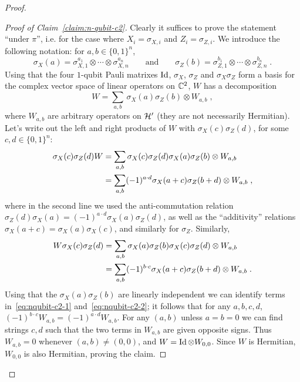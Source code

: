 \begin{proof}
\begin{proof}[Proof of Claim~\ref{claim:n-qubit-c2}]
Clearly it suffices to prove the statement ``under $\pi$'', i.e. for the case where $X_i = \sigma_{X,i}$ and $Z_i = \sigma_{Z,i}$. We introduce the following notation: for $a,b\in\{0,1\}^n$, 
\[\sigma_X(a) = \sigma_{X,1}^{a_1} \otimes \cdots \otimes \sigma_{X,n}^{a_n}\qquad\text{and}\qquad\sigma_Z(b) = \sigma_{Z,1}^{b_1} \otimes \cdots \otimes \sigma_{Z,n}^{b_n}\;.\]
Using that the four $1$-qubit Pauli matrixes $\mathop{\rm Id}\nolimits$, $\sigma_X$, $\sigma_Z$ and $\sigma_X\sigma_Z$ form a basis for the complex vector space of linear operators on $\mathbb{C}^2$, $W$ has a decomposition 
\[ W = \sum_{a,b}\, \sigma_X(a) \sigma_Z(b) \otimes W_{a,b}\;,\]
where $W_{a,b}$ are arbitrary operators on $\mathcal{H}'$ (they are not necessarily Hermitian).
Let's write out the left and right products of $W$ with $\sigma_X(c)\sigma_Z(d)$, for some $c,d\in\{0,1\}^n$:
\begin{align}
 \sigma_X(c)\sigma_Z(d) W &= \sum_{a,b} \sigma_X(c)\sigma_Z(d) \sigma_X(a) \sigma_Z(b) \otimes W_{a,b}\notag\\
&= \sum_{a,b} (-1)^{a\cdot d} \sigma_X(a+c) \sigma_Z(b+d) \otimes W_{a,b}\;,\label{eq:nqubit-c2-1}
\end{align}
where in the second line we used the anti-commutation relation $\sigma_Z(d) \sigma_X(a) =(-1)^{a\cdot d} \sigma_X(a) \sigma_Z(d)$, as well as the ``additivity'' relations $\sigma_X(a+c)=\sigma_X(a)\sigma_X(c)$, and similarly for $\sigma_Z$. Similarly, 
\begin{align}
 W  \sigma_X(c)\sigma_Z(d)&= \sum_{a,b} \sigma_X(a) \sigma_Z(b) \sigma_X(c)\sigma_Z(d) \otimes W_{a,b}\notag\\
&= \sum_{a,b} (-1)^{b\cdot c} \sigma_X(a+c) \sigma_Z(b+d) \otimes W_{a,b}\;.\label{eq:nqubit-c2-2}
\end{align}
 Using that the $ \sigma_X(a) \sigma_Z(b)$ are linearly independent we can identify terms in~\eqref{eq:nqubit-c2-1} and~\eqref{eq:nqubit-c2-2}; it follows that for any $a,b,c,d$, $(-1)^{b\cdot c} W_{a,b} = (-1)^{a \cdot d} W_{a,b}$. For any $(a,b)$ unless $a=b=0$ we can find strings $c,d$ such that the two terms in $W_{a,b}$ are given opposite signs. Thus $W_{a,b}=0$ whenever $(a,b)\neq (0,0)$, and $W = \mathop{\rm Id}\nolimits \otimes W_{0,0}$. Since $W$ is Hermitian, $W_{0,0}$ is also Hermitian, proving the claim. 
\end{proof}

\end{proof}

